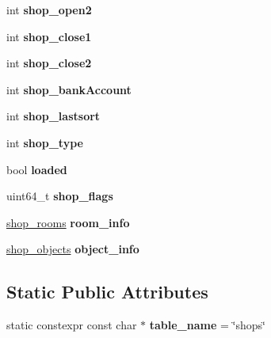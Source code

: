 \begin{DoxyCompactItemize}
\mbox{\label{structmods_1_1orm_1_1shop_a4a9028a12a895ae36938b91c87cd9c2f}} 
int {\bfseries shop\+\_\+open2}
\item 
\mbox{\label{structmods_1_1orm_1_1shop_a43fcc611d003a7b1fca630b709a4ef4a}} 
int {\bfseries shop\+\_\+close1}
\item 
\mbox{\label{structmods_1_1orm_1_1shop_ab0e9ca89f3a3e82d665e09ebb447587f}} 
int {\bfseries shop\+\_\+close2}
\item 
\mbox{\label{structmods_1_1orm_1_1shop_a82179733cbb07ba02107fb77cc5e6ef8}} 
int {\bfseries shop\+\_\+bank\+Account}
\item 
\mbox{\label{structmods_1_1orm_1_1shop_a143fd67d6b8ba4f546923b395625bf32}} 
int {\bfseries shop\+\_\+lastsort}
\item 
\mbox{\label{structmods_1_1orm_1_1shop_ab29cb81d86c6b78eff044872c35c2852}} 
int {\bfseries shop\+\_\+type}
\item 
\mbox{\label{structmods_1_1orm_1_1shop_a7f57c4c26d04906bb2efc8fc3523236d}} 
bool {\bfseries loaded}
\item 
\mbox{\label{structmods_1_1orm_1_1shop_ae7e36075cbd2799873676c93b988f085}} 
uint64\+\_\+t {\bfseries shop\+\_\+flags}
\item 
\mbox{\label{structmods_1_1orm_1_1shop_af9bf4888996a8ddfa0929fd7d1674db4}} 
\hyperlink{structmods_1_1orm_1_1shop__rooms}{shop\+\_\+rooms} {\bfseries room\+\_\+info}
\item 
\mbox{\label{structmods_1_1orm_1_1shop_ab53c0f829b7370ff9923d201fa523146}} 
\hyperlink{structmods_1_1orm_1_1shop__objects}{shop\+\_\+objects} {\bfseries object\+\_\+info}
\end{DoxyCompactItemize}
\subsection*{Static Public Attributes}
\begin{DoxyCompactItemize}
\item 
\mbox{\label{structmods_1_1orm_1_1shop_a6552986c4d062d01fe3126a340ec31ba}} 
static constexpr const char $\ast$ {\bfseries table\+\_\+name} = \char`\"{}shops\char`\"{}
\end{DoxyCompactItemize}


